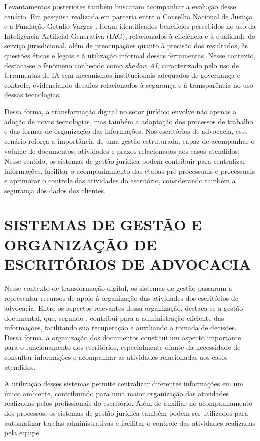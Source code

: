 Levantamentos posteriores também buscaram acompanhar a evolução desse cenário. Em pesquisa realizada em parceria entre o Conselho Nacional de Justiça e a Fundação Getulio Vargas \cite{cnjfgv2025}, foram identificados benefícios percebidos no uso da Inteligência Artificial Generativa (IAG), relacionados à eficiência e à qualidade do serviço jurisdicional, além de preocupações quanto à precisão dos resultados, às questões éticas e legais e à utilização informal dessas ferramentas. Nesse contexto, destaca-se o fenômeno conhecido como \textit{shadow AI}, caracterizado pelo uso de ferramentas de IA sem mecanismos institucionais adequados de governança e controle, evidenciando desafios relacionados à segurança e à transparência no uso dessas tecnologias.

Dessa forma, a transformação digital no setor jurídico envolve não apenas a adoção de novas tecnologias, mas também a adaptação dos processos de trabalho e das formas de organização das informações. Nos escritórios de advocacia, esse cenário reforça a importância de uma gestão estruturada, capaz de acompanhar o volume de documentos, atividades e prazos relacionados aos casos atendidos. Nesse sentido, os sistemas de gestão jurídica podem contribuir para centralizar informações, facilitar o acompanhamento das etapas pré-processuais e processuais e aprimorar o controle das atividades do escritório, considerando também a segurança dos dados dos clientes.

\section{SISTEMAS DE GESTÃO E ORGANIZAÇÃO DE ESCRITÓRIOS DE ADVOCACIA}

Nesse contexto de transformação digital, os sistemas de gestão passaram a representar recursos de apoio à organização das atividades dos escritórios de advocacia. Entre os aspectos relevantes dessa organização, destaca-se a gestão documental, que, segundo \cite{aleixo2019gestao}, contribui para a administração eficiente das informações, facilitando sua recuperação e auxiliando a tomada de decisões. Dessa forma, a organização dos documentos constitui um aspecto importante para o funcionamento dos escritórios, especialmente diante da necessidade de consultar informações e acompanhar as atividades relacionadas aos casos atendidos.

A utilização desses sistemas permite centralizar diferentes informações em um único ambiente, contribuindo para uma maior organização das atividades realizadas pelos profissionais do escritório. Além de auxiliar no acompanhamento dos processos, os sistemas de gestão jurídica também podem ser utilizados para automatizar tarefas administrativas e facilitar o controle das atividades realizadas pela equipe.

